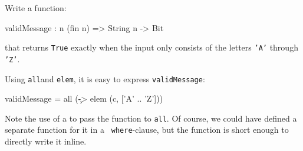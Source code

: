 \begin{Exercise}\label{ex:cond:2}
Write a function:
\begin{code}
  validMessage : {n} (fin n) => String n -> Bit
\end{code}
that returns {\tt True} exactly when the input only consists of the
letters {\tt 'A'} through {\tt 'Z'}. 
\end{Exercise}

\begin{Answer}
  Using {\tt all}\indAll and {\tt elem}\indElem, it is easy to express
  {\tt validMessage}:
\begin{code}
  validMessage = all (\c -> elem (c, ['A' .. 'Z']))
\end{code}
Note the use of a \lamex to pass the function to {\tt all}. Of course,
we could have defined a separate function for it in a {\tt
  where}-clause\indWhere, but the function is short enough to directly
write it inline.
\end{Answer}


